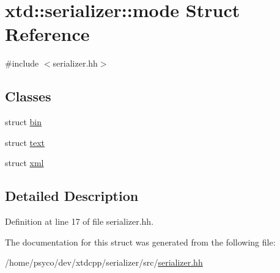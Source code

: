 \hypertarget{structxtd_1_1serializer_1_1mode}{}\section{xtd\+:\+:serializer\+:\+:mode Struct Reference}
\label{structxtd_1_1serializer_1_1mode}


{\ttfamily \#include $<$serializer.\+hh$>$}

\subsection*{Classes}
\begin{DoxyCompactItemize}
\item 
struct \hyperlink{structxtd_1_1serializer_1_1mode_1_1bin}{bin}
\item 
struct \hyperlink{structxtd_1_1serializer_1_1mode_1_1text}{text}
\item 
struct \hyperlink{structxtd_1_1serializer_1_1mode_1_1xml}{xml}
\end{DoxyCompactItemize}


\subsection{Detailed Description}


Definition at line 17 of file serializer.\+hh.



The documentation for this struct was generated from the following file\+:\begin{DoxyCompactItemize}
\item 
/home/psyco/dev/xtdcpp/serializer/src/\hyperlink{serializer_8hh}{serializer.\+hh}\end{DoxyCompactItemize}
